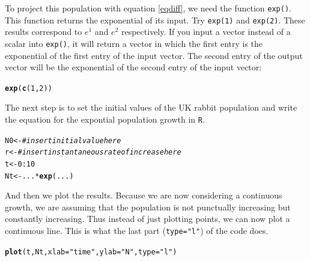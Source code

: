 \documentclass{article}\usepackage[]{graphicx}\usepackage[]{color}
\makeatletter
\newcommand{\hlnum}[1]{\textcolor[rgb]{0.686,0.059,0.569}{#1}}%
\newcommand{\hlstr}[1]{\textcolor[rgb]{0.192,0.494,0.8}{#1}}%
\newcommand{\hlcom}[1]{\textcolor[rgb]{0.678,0.584,0.686}{\textit{#1}}}%
\newcommand{\hlopt}[1]{\textcolor[rgb]{0,0,0}{#1}}%
\newcommand{\hlstd}[1]{\textcolor[rgb]{0.345,0.345,0.345}{#1}}%
\newcommand{\hlkwb}[1]{\textcolor[rgb]{0.69,0.353,0.396}{#1}}%
\newcommand{\hlkwc}[1]{\textcolor[rgb]{0.333,0.667,0.333}{#1}}%
\newcommand{\hlkwd}[1]{\textcolor[rgb]{0.737,0.353,0.396}{\textbf{#1}}}%
\newenvironment{kframe}{%
 \def\at@end@of@kframe{}%
 \ifinner\ifhmode%
  \def\at@end@of@kframe{\end{minipage}}%
  \begin{minipage}{\columnwidth}%
 \fi\fi%
 \def\FrameCommand##1{\hskip\@totalleftmargin \hskip-\fboxsep
 \colorbox{shadecolor}{##1}\hskip-\fboxsep
     \hskip-\linewidth \hskip-\@totalleftmargin \hskip\columnwidth}%
 \MakeFramed {\advance\hsize-\width
   \@totalleftmargin\z@ \linewidth\hsize
   \@setminipage}}%
 {\par\unskip\endMakeFramed%
 \at@end@of@kframe}
\newenvironment{knitrout}{}{} %
\makeatother
\begin{document}
To project this population with equation \ref{eqdiff}, we need the function \texttt{exp()}. This function returns the exponential of its input. Try \texttt{exp(1)} and \texttt{exp(2)}. These results correspond to $e^1$ and $e^2$ respectively. If you input a vector instead of a scalar into \texttt{exp()}, it will return a vector in which the first entry is the exponential of the first entry of the input vector. The second entry of the output vector will be the exponential of the second entry of the input vector:
\begin{knitrout}
\color{fgcolor}\begin{kframe}
\begin{alltt}
\hlkwd{exp}\hlstd{(}\hlkwd{c}\hlstd{(}\hlnum{1}\hlstd{,} \hlnum{2}\hlstd{))}
\end{alltt}
\end{kframe}
\end{knitrout}
The next step is to set the initial values of the UK rabbit population and write the equation for the expontial population growth in \texttt{R}.
\begin{knitrout}
\color{fgcolor}\begin{kframe}
\begin{alltt}
\hlstd{N0} \hlkwb{<-} \hlcom{#insert initial value here}
\hlstd{r} \hlkwb{<-}  \hlcom{#insert instantaneous rate of increase here }
\hlstd{t} \hlkwb{<-} \hlnum{0}\hlopt{:}\hlnum{10}
\hlstd{Nt} \hlkwb{<-} \hlstd{...}\hlopt{*}\hlkwd{exp}\hlstd{(...)}
\end{alltt}
\end{kframe}
\end{knitrout}
And then we plot the results. Because we are now considering a continuous growth, we are assuming that the population is not punctually increasing but constantly increasing. Thus instead of just plotting points, we can now plot a continuous line. This is what the last part (\verb+type="l"+) of the code does.
\begin{knitrout}
\color{fgcolor}\begin{kframe}
\begin{alltt}
\hlkwd{plot}\hlstd{(t, Nt,} \hlkwc{xlab}\hlstd{=}\hlstr{"time"}\hlstd{,} \hlkwc{ylab}\hlstd{=}\hlstr{"N"}\hlstd{,} \hlkwc{type}\hlstd{=}\hlstr{"l"}\hlstd{)}
\end{alltt}
\end{kframe}
\end{knitrout}
\end{document}
